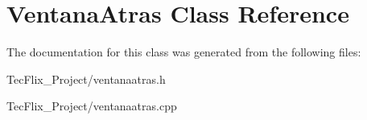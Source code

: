 \hypertarget{classVentanaAtras}{}\section{Ventana\+Atras Class Reference}
\label{classVentanaAtras}


The documentation for this class was generated from the following files\+:\begin{DoxyCompactItemize}
\item 
Tec\+Flix\+\_\+\+Project/ventanaatras.\+h\item 
Tec\+Flix\+\_\+\+Project/ventanaatras.\+cpp\end{DoxyCompactItemize}
